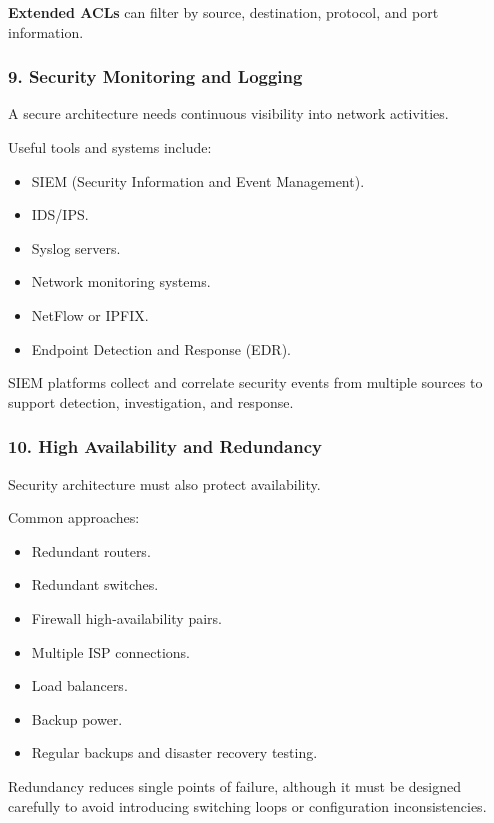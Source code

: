 \textbf{Extended ACLs} can filter by source, destination, protocol, and port information.

\subsubsection{9. Security Monitoring and Logging}

A secure architecture needs continuous visibility into network activities.

Useful tools and systems include:

\begin{itemize}
\item SIEM (Security Information and Event Management).
\item IDS/IPS.
\item Syslog servers.
\item Network monitoring systems.
\item NetFlow or IPFIX.
\item Endpoint Detection and Response (EDR).
\end{itemize}

SIEM platforms collect and correlate security events from multiple sources to support detection, investigation, and response.

\subsubsection{10. High Availability and Redundancy}

Security architecture must also protect availability.

Common approaches:

\begin{itemize}
\item Redundant routers.
\item Redundant switches.
\item Firewall high-availability pairs.
\item Multiple ISP connections.
\item Load balancers.
\item Backup power.
\item Regular backups and disaster recovery testing.
\end{itemize}

Redundancy reduces single points of failure, although it must be designed carefully to avoid introducing switching loops or configuration inconsistencies.

